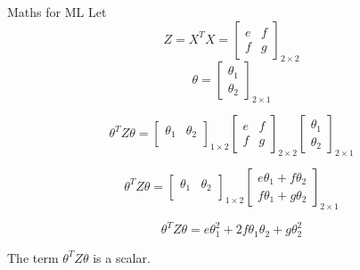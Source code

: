 \documentclass{beamer}
\begin{document}
\begin{frame}{Maths for ML}
Let
\begin{equation*}
Z = X^{T}X =  \begin{bmatrix}
e&f\\
f&g
\end{bmatrix}_{2\times 2}
\end{equation*}
 \pause   \begin{equation*}
        \theta = \begin{bmatrix}
        \theta_{1}\\
        \theta_{2}
        \end{bmatrix}_{2\times 1}
    \end{equation*}
    
    \pause
    \begin{equation*}
    \theta^{T}Z\theta=  \begin{bmatrix}
    \theta_1&\theta_2\\

    \end{bmatrix}_{1\times 2} \begin{bmatrix}
    e&f\\
    f&g
    \end{bmatrix}_{2\times 2}\begin{bmatrix}
    \theta_{1}\\
    \theta_{2}
    \end{bmatrix}_{2\times 1}
    \end{equation*}
    
    \pause
       \begin{equation*}
    \theta^{T}Z\theta=  \begin{bmatrix}
    \theta_1&\theta_2\\
    
    \end{bmatrix}_{1\times 2} \begin{bmatrix}
    e\theta_1+f\theta_2\\
    f\theta_1+g\theta_2
    \end{bmatrix}_{2\times 1}
    \end{equation*}
    
    
    \begin{equation*}
        \theta^{T}Z\theta = e\theta_{1}^{2} + 2f\theta_{1}\theta_{2}+g\theta_{2}^{2} 
    \end{equation*}

The term $\theta^{T}Z\theta$ is a scalar.

\end{frame}
\end{document}
